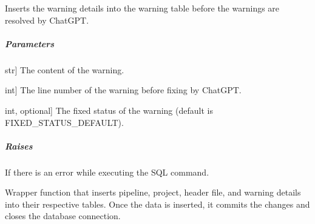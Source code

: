 \documentclass[letterpaper,10pt,english]{sphinxmanual}
\begin{document}
\begin{fulllineitems}
\begin{fulllineitems}
\label{\detokenize{main.db_operations:main.db_operations.db_insertion_handler.DBInsertionHandler.insert_into_warning_table_pre_fix}}
\pysigstartsignatures
{}
\pysigstopsignatures
\sphinxAtStartPar
Inserts the warning details into the warning table before the warnings are resolved by ChatGPT.


\subparagraph{Parameters}
\label{\detokenize{main.db_operations:id6}}\begin{description}
\sphinxlineitem{warning\_content}{[}str{]}
\sphinxAtStartPar
The content of the warning.

\sphinxlineitem{line\_number\_pre\_fix}{[}int{]}
\sphinxAtStartPar
The line number of the warning before fixing by ChatGPT.

\sphinxlineitem{fixed\_status}{[}int, optional{]}
\sphinxAtStartPar
The fixed status of the warning (default is FIXED\_STATUS\_DEFAULT).

\end{description}


\subparagraph{Raises}
\label{\detokenize{main.db_operations:id7}}\begin{description}
\sphinxAtStartPar
If there is an error while executing the SQL command.

\end{description}

\end{fulllineitems}


\begin{fulllineitems}
\label{\detokenize{main.db_operations:main.db_operations.db_insertion_handler.DBInsertionHandler.insert_warnings_details}}
\pysigstartsignatures
{}
\pysigstopsignatures
\sphinxAtStartPar
Wrapper function that inserts pipeline, project, header file, and warning details into their respective tables.
Once the data is inserted, it commits the changes and closes the database connection.



\end{fulllineitems}
\end{fulllineitems}
\end{document}
